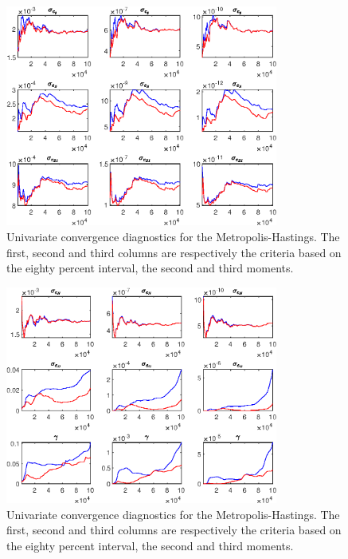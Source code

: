  
\begin{figure}[H]
\centering 
\includegraphics[width=0.80\textwidth]{BRS_growth_util/Output/BRS_growth_util_udiag1}
\caption{Univariate convergence diagnostics for the Metropolis-Hastings.
The first, second and third columns are respectively the criteria based on
the eighty percent interval, the second and third moments.}\label{Fig:UnivariateDiagnostics:1}
\end{figure}

\begin{figure}[H]
\centering 
\includegraphics[width=0.80\textwidth]{BRS_growth_util/Output/BRS_growth_util_udiag2}
\caption{Univariate convergence diagnostics for the Metropolis-Hastings.
The first, second and third columns are respectively the criteria based on
the eighty percent interval, the second and third moments.}\label{Fig:UnivariateDiagnostics:2}
\end{figure}


